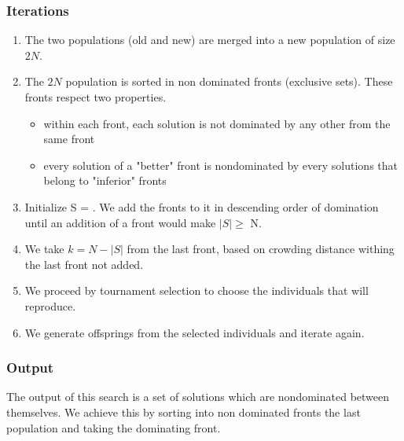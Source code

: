 \documentclass[a4paper, 12pt] {article}
\begin{document}
\subsubsection*{Iterations}
\begin{enumerate}
  \item The two populations (old and new) are merged into a new population of size $2N$.
  \item The $2N$ population is sorted in non dominated fronts (exclusive sets). These fronts respect two properties.	
  \begin{itemize}
    \item within each front, each solution is not dominated by any other from the same front
    \item every solution of a "better" front is nondominated by every solutions that belong to "inferior" fronts
  \end{itemize}
  \item Initialize S = {}. We add the fronts to it in descending order of domination until an addition of a front would make $\left\vert{S}\right\vert \geq$ N. 
  \item We take $k = N - \left\vert{S}\right\vert $ from the last front, based on crowding distance withing the last front not added.
  \item We proceed by tournament selection to choose the individuals that will reproduce.
  \item We generate offsprings from the selected individuals and iterate again.
\end{enumerate}

\subsubsection*{Output}
The output of this search is a set of solutions which are nondominated between themselves. We achieve this by 
sorting into non dominated fronts the last population and taking the dominating front.

%     
 
\end{document}
